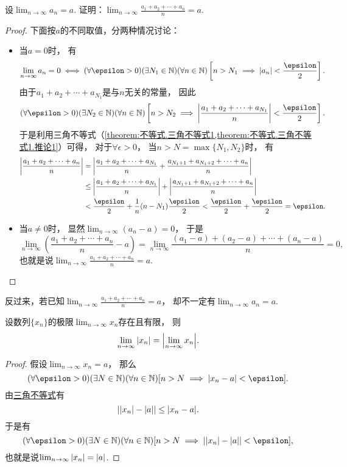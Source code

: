 \begin{example}\label{example:极限.数列的算术平均的极限}
设\(\lim_{n\to\infty} a_n = a\).
证明：\(\lim_{n\to\infty} \frac{a_1+a_2+\dotsb+a_n}{n} = a\).
\begin{proof}
下面按\(a\)的不同取值，分两种情况讨论：
\begin{itemize}
	\item 当\(a=0\)时，
	有\[
		\lim_{n\to\infty} a_n = 0
		\iff
		(\forall\epsilon>0)
		(\exists N_1\in\mathbb{N})
		(\forall n\in\mathbb{N})
		\left[n>N_1 \implies \abs{a_n}<\frac\epsilon2\right].
	\]
	由于\(a_1 + a_2 + \dotsb + a_{N_1}\)是与\(n\)无关的常量，
	因此\[
		(\forall\epsilon>0)
		(\exists N_2\in\mathbb{N})
		(\forall n\in\mathbb{N})
		\left[
			n>N_2
			\implies
			\abs{\frac{a_1 + a_2 + \dotsb + a_{N_1}}{n}} < \frac\epsilon2
		\right].
	\]
	于是利用三角不等式（\cref{theorem:不等式.三角不等式1,theorem:不等式.三角不等式1.推论1}）可得，
	对于\(\forall\epsilon>0\)，
	当\(n>N=\max\{N_1,N_2\}\)时，
	有\begin{align*}
		\abs{\frac{a_1 + a_2 + \dotsb + a_n}{n}}
		&= \abs{
			\frac{a_1 + a_2 + \dotsb + a_{N_1}}{n}
			+ \frac{a_{N_1+1} + a_{N_1+2} + \dotsb + a_n}{n}
		} \\
		&\leq \abs{\frac{a_1 + a_2 + \dotsb + a_{N_1}}{n}}
		+ \abs{\frac{a_{N_1+1} + a_{N_1+2} + \dotsb + a_n}{n}} \\
		&< \frac\epsilon2 + \frac1n (n-N_1) \frac\epsilon2
		< \frac\epsilon2 + \frac\epsilon2
		= \epsilon.
	\end{align*}

	\item 当\(a\neq0\)时，
	显然\(\lim_{n\to\infty} (a_n - a) = 0\)，
	于是\[
		\lim_{n\to\infty} \left(\frac{a_1+a_2+\dotsb+a_n}{n}-a\right)
		= \lim_{n\to\infty} \frac{(a_1-a)+(a_2-a)+\dotsb+(a_n-a)}{n}
		= 0,
	\]
	也就是说\(\lim_{n\to\infty} \frac{a_1+a_2+\dotsb+a_n}{n} = a\).
	\qedhere
\end{itemize}
\end{proof}
\end{example}
\begin{remark}
反过来，若已知\(\lim_{n\to\infty} \frac{a_1+a_2+\dotsb+a_n}{n} = a\)，
却不一定有\(\lim_{n\to\infty} a_n = a\).
\end{remark}

\begin{proposition}\label{theorem:极限.数列的绝对值的极限}
设数列\(\{x_n\}\)的极限\(\lim_{n\to\infty} x_n\)存在且有限，
则\[
	\lim_{n\to\infty} \abs{x_n} = \abs{\lim_{n\to\infty} x_n}.
\]
\begin{proof}
假设\(\lim_{n\to\infty} x_n = a\)，
那么\[
	(\forall\epsilon>0)
	(\exists N\in\mathbb{N})
	(\forall n\in\mathbb{N})
	[n>N \implies \abs{x_n - a} < \epsilon].
\]
由\hyperref[theorem:不等式.三角不等式2]{三角不等式}有\[
	\abs{\abs{x_n} - \abs{a}} \leq \abs{x_n - a}.
\]
于是有\[
	(\forall\epsilon>0)
	(\exists N\in\mathbb{N})
	(\forall n\in\mathbb{N})
	[n>N \implies \abs{\abs{x_n} - \abs{a}} < \epsilon],
\]
也就是说\(\lim_{n\to\infty} \abs{x_n} = \abs{a}\).
\end{proof}
\end{proposition}

